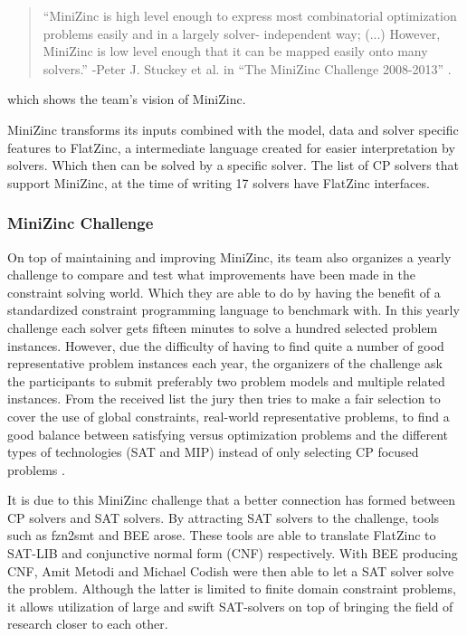\begin{quote}
	“MiniZinc is high level enough to express most combinatorial optimization problems easily and in a largely solver-
	independent way; (...) However, MiniZinc is low level enough that it can be mapped easily onto many solvers.” 
	\newline
	-Peter J. Stuckey et al. in “The MiniZinc Challenge 2008-2013” \cite{58stuckey2014minizinc}.
\end{quote} which shows the team’s vision of MiniZinc.

MiniZinc transforms its inputs combined with the model, data and solver specific features to FlatZinc, a intermediate language created for easier interpretation by solvers. Which then can be solved by a specific solver. The list of CP solvers that support MiniZinc, at the time of writing 17 solvers have FlatZinc interfaces.

\subsubsection{MiniZinc Challenge}
On top of maintaining and improving MiniZinc, its team also organizes a yearly challenge to compare and test what improvements have been made in the constraint solving world. Which they are able to do by having the benefit of a standardized constraint programming language to benchmark with. 
In this yearly challenge each solver gets fifteen minutes to solve a hundred selected problem instances. However, due the difficulty of having to find quite a number of good representative problem instances each year, the organizers of the challenge ask the participants to submit preferably two problem models and multiple related instances. From the received list the jury then tries to make a fair selection to cover the use of global constraints, real-world representative problems, to find a good balance between satisfying versus optimization problems and the different types of technologies (SAT and MIP) instead of only selecting CP focused problems \cite{58stuckey2014minizinc}.

It is due to this MiniZinc challenge that a better connection has formed between CP solvers and SAT solvers. By attracting SAT solvers to the challenge, tools such as fzn2smt \cite{72bofill2010system} and BEE \cite{69BEEmetodi2012compiling} arose. These tools are able to translate FlatZinc to SAT-LIB and conjunctive normal form (CNF) respectively. 
With BEE producing CNF, Amit Metodi and Michael Codish were then able to let a SAT solver solve the problem. Although the latter is limited to finite domain constraint problems, it allows utilization of large and swift SAT-solvers on top of bringing the field of research closer to each other.

